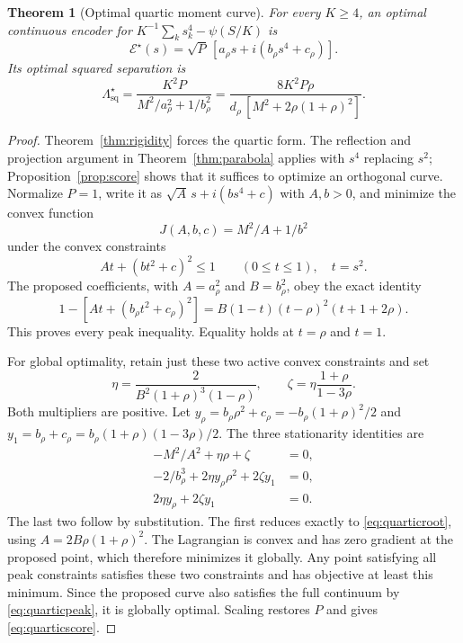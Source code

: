 \documentclass[11pt,letterpaper]{article}
\newtheorem{theorem}{Theorem}
\theoremstyle{remark}
\newcommand{\enc}{\mathscr E}
\newcommand{\sq}{\mathrm{sq}}
\begin{document}
\begin{theorem}[Optimal quartic moment curve]
\label{thm:quartic}
For every $K\ge4$, an optimal continuous encoder for $K^{-1}\sum_k s_k^4-\psi(S/K)$ is
\begin{equation}
 \boxed{\enc^\star(s)=\sqrt P\,[a_\rho s+i(b_\rho s^4+c_\rho)]}.
 \label{eq:quarticmap}
\end{equation}
Its optimal squared separation is
\begin{equation}
 \boxed{\Lambda_{\sq}^\star
 =\frac{K^2P}{M^2/a_\rho^2+1/b_\rho^2}
 =\frac{8K^2P\rho}
 {d_\rho\,[M^2+2\rho(1+\rho)^2]}}.
 \label{eq:quarticscore}
\end{equation}
\end{theorem}
\begin{proof}
Theorem~\ref{thm:rigidity} forces the quartic form. The reflection and projection argument in Theorem~\ref{thm:parabola} applies with $s^4$ replacing $s^2$; Proposition~\ref{prop:score} shows that it suffices to optimize an orthogonal curve. Normalize $P=1$, write it as $\sqrt A\,s+i(bs^4+c)$ with $A,b>0$, and minimize the convex function
$$
 J(A,b,c)=M^2/A+1/b^2
$$
under the convex constraints
$$
 A t+(bt^2+c)^2\le1\qquad(0\le t\le1),
 \quad t=s^2.
$$
The proposed coefficients, with $A=a_\rho^2$ and $B=b_\rho^2$, obey the exact identity
\begin{equation}
 1-\left[A t+(b_\rho t^2+c_\rho)^2\right]
 =B(1-t)(t-\rho)^2(t+1+2\rho).
 \label{eq:quarticpeak}
\end{equation}
This proves every peak inequality. Equality holds at $t=\rho$ and $t=1$.

For global optimality, retain just these two active convex constraints and set
$$
 \eta=\frac{2}{B^2(1+\rho)^3(1-\rho)},\qquad
 \zeta=\eta\frac{1+\rho}{1-3\rho}.
$$
Both multipliers are positive. Let $y_\rho=b_\rho\rho^2+c_\rho=-b_\rho(1+\rho)^2/2$ and $y_1=b_\rho+c_\rho=b_\rho(1+\rho)(1-3\rho)/2$. The three stationarity identities are
\begin{equation}
\begin{aligned}
 -M^2/A^2+\eta\rho+\zeta&=0,\\
 -2/b_\rho^3+2\eta y_\rho\rho^2+2\zeta y_1&=0,\\
 2\eta y_\rho+2\zeta y_1&=0.
\end{aligned}
\label{eq:kkt}
\end{equation}
The last two follow by substitution. The first reduces exactly to \eqref{eq:quarticroot}, using $A=2B\rho(1+\rho)^2$. The Lagrangian is convex and has zero gradient at the proposed point, which therefore minimizes it globally. Any point satisfying all peak constraints satisfies these two constraints and has objective at least this minimum. Since the proposed curve also satisfies the full continuum by \eqref{eq:quarticpeak}, it is globally optimal. Scaling restores $P$ and gives \eqref{eq:quarticscore}.
\end{proof}
\end{document}
